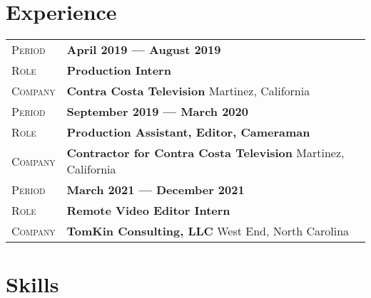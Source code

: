\documentclass[a4paper, oneside, final]{scrartcl} %
\newcommand{\gray}{\rowcolor[gray]{.90}} %
\begin{document}
\begin{center}
\section{Experience}

\begin{tabularx}{0.97\linewidth}{>{\raggedleft\scshape}p{2cm}X}
\gray Period & \textbf{April 2019 --- August 2019}\\
\gray Role & \textbf{Production Intern}\\
\gray Company & \textbf{Contra Costa Television} \hfill Martinez, California\\
\arrayrulecolor{gray}\hline
\gray Period & \textbf{September 2019 --- March 2020}\\
\gray Role & \textbf{Production Assistant, Editor, Cameraman}\\
\gray Company & \textbf{Contractor for Contra Costa Television} \hfill Martinez, California\\
\arrayrulecolor{gray}\hline
\gray Period & \textbf{March 2021 --- December 2021}\\
\gray Role & \textbf{Remote Video Editor Intern}\\
\gray Company & \textbf{TomKin Consulting, LLC} \hfill West End, North Carolina\\
\end{tabularx}

\section{Skills}


\end{center}
\end{document}
